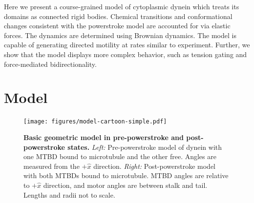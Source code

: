 \documentclass[9pt,twocolumn,twoside]{pnas-new}
\begin{document}
Here we present a course-grained model of cytoplasmic dynein which treats its domains as connected rigid bodies. Chemical transitions and conformational changes consistent with the powerstroke model are accounted for via elastic forces. The dynamics are determined using Brownian dynamics. The model is capable of generating directed motility at rates similar to experiment. Further, we show that the model displays more complex behavior, such as tension gating and force-mediated bidirectionality.\\


\section*{Model}

\begin{figure}[tbhp]
\centering
\texttt{[image: figures/model-cartoon-simple.pdf]}
\caption{\textbf{Basic geometric model in pre-powerstroke and post-powerstroke states.} \textit{Left: } Pre-powerstroke model of dynein with one MTBD bound to microtubule and the other free. Angles are measured from the $+\hat{x}$ direction. \textit{Right: } Post-powerstroke model with both MTBDs bound to microtubule. MTBD angles are relative to $+\hat{x}$ direction, and motor angles are between stalk and tail. Lengths and radii not to scale.}
\label{fig:model}
\end{figure}
\end{document}
